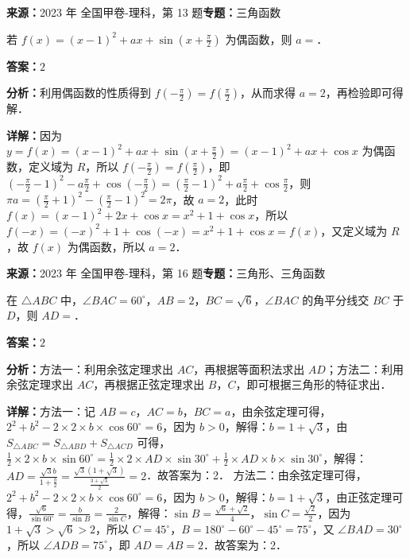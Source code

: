 \begin{question}[points=5]
\textbf{来源：}2023 年 全国甲卷-理科，第 13 题\quad \textbf{专题：}三角函数\par
若 $f(x) = (x-1)^2 + ax + \sin\left(x + \frac{\pi}{2}\right)$ 为偶函数，则 $a = $．
\fillin[{$2$}]
\begin{solution}
\textbf{答案：}$2$

\textbf{分析：}利用偶函数的性质得到 $f\left(-\frac{\pi}{2}\right) = f\left(\frac{\pi}{2}\right)$，从而求得 $a=2$，再检验即可得解．

\textbf{详解：}因为 $y = f(x) = (x-1)^2 + ax + \sin\left(x+\frac{\pi}{2}\right) = (x-1)^2 + ax + \cos x$ 为偶函数，定义域为 $R$，所以 $f\left(-\frac{\pi}{2}\right) = f\left(\frac{\pi}{2}\right)$，即 $\left(-\frac{\pi}{2}-1\right)^2 - a\frac{\pi}{2} + \cos\left(-\frac{\pi}{2}\right) = \left(\frac{\pi}{2}-1\right)^2 + a\frac{\pi}{2} + \cos\frac{\pi}{2}$，则 $\pi a = \left(\frac{\pi}{2}+1\right)^2 - \left(\frac{\pi}{2}-1\right)^2 = 2\pi$，故 $a=2$，此时 $f(x) = (x-1)^2 + 2x + \cos x = x^2 + 1 + \cos x$，所以 $f(-x) = (-x)^2 + 1 + \cos(-x) = x^2+1+\cos x = f(x)$，又定义域为 $R$，故 $f(x)$ 为偶函数，所以 $a=2$．
\end{solution}
\end{question}

\begin{question}[points=5]
\textbf{来源：}2023 年 全国甲卷-理科，第 16 题\quad \textbf{专题：}三角形、三角函数\par
在 $\triangle ABC$ 中，$\angle BAC = 60^\circ$，$AB = 2$，$BC = \sqrt{6}$，$\angle BAC$ 的角平分线交 $BC$ 于 $D$，则 $AD = $．
\fillin[{$2$}]
\begin{solution}
\textbf{答案：}$2$

\textbf{分析：}方法一：利用余弦定理求出 $AC$，再根据等面积法求出 $AD$；方法二：利用余弦定理求出 $AC$，再根据正弦定理求出 $B$，$C$，即可根据三角形的特征求出．

\textbf{详解：}方法一：记 $AB=c$，$AC=b$，$BC=a$，由余弦定理可得，$2^2+b^2-2\times2\times b\times\cos60^\circ = 6$，因为 $b>0$，解得：$b=1+\sqrt{3}$，由 $S_{\triangle ABC} = S_{\triangle ABD} + S_{\triangle ACD}$ 可得，$\frac{1}{2}\times2\times b\times\sin60^\circ = \frac{1}{2}\times2\times AD\times\sin30^\circ + \frac{1}{2}\times AD\times b\times\sin30^\circ$，解得：$AD = \frac{\sqrt{3}b}{1+\frac{b}{2}} = \frac{\sqrt{3}(1+\sqrt{3})}{\frac{3+\sqrt{3}}{2}} = 2$．故答案为：2．
方法二：由余弦定理可得，$2^2+b^2-2\times2\times b\times\cos60^\circ = 6$，因为 $b>0$，解得：$b=1+\sqrt{3}$，由正弦定理可得，$\frac{\sqrt{6}}{\sin60^\circ} = \frac{b}{\sin B} = \frac{2}{\sin C}$，解得：$\sin B = \frac{\sqrt{6}+\sqrt{2}}{4}$，$\sin C = \frac{\sqrt{2}}{2}$，因为 $1+\sqrt{3} > \sqrt{6} > 2$，所以 $C=45^\circ$，$B=180^\circ-60^\circ-45^\circ=75^\circ$，又 $\angle BAD = 30^\circ$，所以 $\angle ADB = 75^\circ$，即 $AD = AB = 2$．故答案为：2．
\end{solution}
\end{question}

